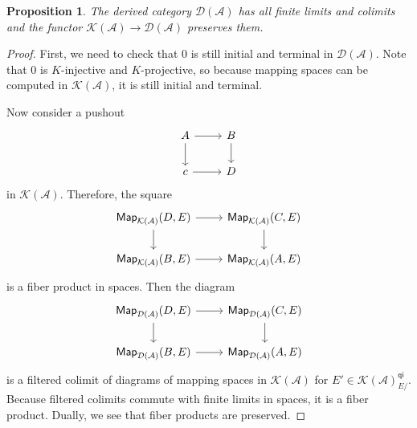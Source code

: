 \documentclass[10pt, oneside]{memoir}
\newtheorem{prop}[thm]{Proposition}
\theoremstyle{definition}
\theoremstyle{remark}
\theoremstyle{plain}
\theoremstyle{definition}
\theoremstyle{remark}
\newcommand{\mc}[1]{\mathcal{#1}}
\newcommand{\ms}[1]{\mathsf{#1}}
\newcommand{\1}{\mathbf{1}}
\newcommand{\2}{\mathbf{2}}
\newcommand{\3}{\mathbf{3}}
\begin{document}
\begin{prop}
    The derived category $\mc{D}(\mc{A})$ has all finite limits and colimits and the functor $\mc{K}(\mc{A}) \to \mc{D}(\mc{A})$ preserves them.
\end{prop}

\begin{proof}
    First, we need to check that $0$ is still initial and terminal in $\mc{D}(\mc{A})$. Note that $0$ is $K$-injective and $K$-projective, so because mapping spaces can be computed in $\mc{K}(\mc{A})$, it is still initial and terminal.

    Now consider a pushout
    \begin{equation*}
    \begin{tikzcd}
        A \ar{r} \ar{d} & B \ar{d} \\
        c \ar{r} & D
    \end{tikzcd}
    \end{equation*}
    in $\mc{K}(\mc{A})$. Therefore, the square
    \begin{equation*}
    \begin{tikzcd}
        \ms{Map}_{\mc{K}(\mc{A})}(D, E) \ar{r} \ar{d} & \ms{Map}_{\mc{K}(\mc{A})}(C, E) \ar{d} \\
        \ms{Map}_{\mc{K}(\mc{A})}(B, E) \ar{r} & \ms{Map}_{\mc{K}(\mc{A})}(A, E)
    \end{tikzcd}
    \end{equation*}
    is a fiber product in spaces. Then the diagram
    \begin{equation*}
        \begin{tikzcd}
            \ms{Map}_{\mc{D}(\mc{A})}(D, E) \ar{r} \ar{d} & \ms{Map}_{\mc{D}(\mc{A})}(C, E) \ar{d} \\
            \ms{Map}_{\mc{D}(\mc{A})}(B, E) \ar{r} & \ms{Map}_{\mc{D}(\mc{A})}(A, E)
        \end{tikzcd}
    \end{equation*}
    is a filtered colimit of diagrams of mapping spaces in $\mc{K}(\mc{A})$ for $E' \in \mc{K}(\mc{A})_{E/}^{\ms{qi}}$. Because filtered colimits commute with finite limits in spaces, it is a fiber product. Dually, we see that fiber products are preserved.


\end{proof}
\end{document}
